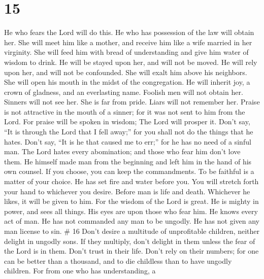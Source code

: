 \hypertarget{section-12}{%
\section{15}\label{section-12}}

 He who fears the Lord will do this. He who has possession
of the law will obtain her.  She will meet him like a
mother, and receive him like a wife married in her virginity.
 She will feed him with bread of understanding and give
him water of wisdom to drink.  He will be stayed upon her,
and will not be moved. He will rely upon her, and will not be
confounded.  She will exalt him above his neighbors. She
will open his mouth in the midst of the congregation.  He
will inherit joy, a crown of gladness, and an everlasting name.
 Foolish men will not obtain her. Sinners will not see
her.  She is far from pride. Liars will not remember her.
 Praise is not attractive in the mouth of a sinner; for it
was not sent to him from the Lord.  For praise will be
spoken in wisdom; The Lord will prosper it.  Don't say,
``It is through the Lord that I fell away;'' for you shall not do the
things that he hates.  Don't say, ``It is he that caused
me to err;'' for he has no need of a sinful man.  The
Lord hates every abomination; and those who fear him don't love them.
 He himself made man from the beginning and left him in
the hand of his own counsel.  If you choose, you can keep
the commandments. To be faithful is a matter of your choice.
 He has set fire and water before you. You will stretch
forth your hand to whichever you desire.  Before man is
life and death. Whichever he likes, it will be given to him.
 For the wisdom of the Lord is great. He is mighty in
power, and sees all things.  His eyes are upon those who
fear him. He knows every act of man.  He has not
commanded any man to be ungodly. He has not given any man license to
sin. \# 16  Don't desire a multitude of unprofitable
children, neither delight in ungodly sons.  If they
multiply, don't delight in them unless the fear of the Lord is in them.
 Don't trust in their life. Don't rely on their numbers;
for one can be better than a thousand, and to die childless than to have
ungodly children.  For from one who has understanding, a
